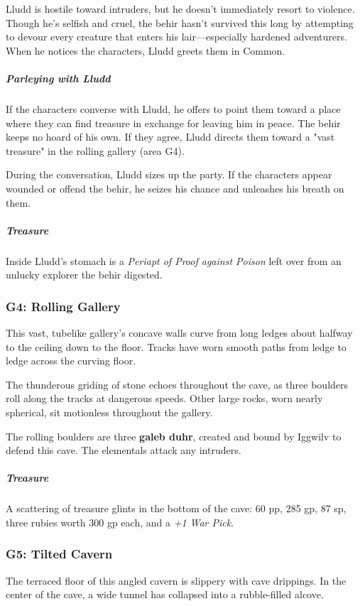 \documentclass[10pt,a4paper,twoside,bg=print,twocolumn,openany,nodeprecatedcode]{dndbook}
\begin{document}
Lludd is hostile toward intruders, but he doesn't immediately resort to violence. Though he's selfish and cruel, the behir hasn't survived this long by attempting to devour every creature that enters his lair—especially hardened adventurers. When he notices the characters, Lludd greets them in Common.

\subparagraph{Parleying with Lludd}
If the characters converse with Lludd, he offers to point them toward a place where they can find treasure in exchange for leaving him in peace. The behir keeps no hoard of his own. If they agree, Lludd directs them toward a "vast treasure" in the rolling gallery (area G4).

During the conversation, Lludd sizes up the party. If the characters appear wounded or offend the behir, he seizes his chance and unleashes his breath on them.

\subparagraph{Treasure}
Inside Lludd's stomach is a \textit{Periapt of Proof against Poison} left over from an unlucky explorer the behir digested.

\subsubsection{G4: Rolling Gallery}
\begin{DndReadAloud}{}
This vast, tubelike gallery's concave walls curve from long ledges about halfway to the ceiling down to the floor. Tracks have worn smooth paths from ledge to ledge across the curving floor.

The thunderous griding of stone echoes throughout the cave, as three boulders roll along the tracks at dangerous speeds. Other large rocks, worn nearly spherical, sit motionless throughout the gallery.

\end{DndReadAloud}

The rolling boulders are three \textbf{galeb duhr}, created and bound by Iggwilv to defend this cave. The elementals attack any intruders.

\subparagraph{Treasure}
A scattering of treasure glints in the bottom of the cave: 60 pp, 285 gp, 87 sp, three rubies worth 300 gp each, and a \textit{+1 War Pick}.

\subsubsection{G5: Tilted Cavern}
\begin{DndReadAloud}{}
The terraced floor of this angled cavern is slippery with cave drippings. In the center of the cave, a wide tunnel has collapsed into a rubble-filled alcove.

\end{DndReadAloud}
\end{document}
